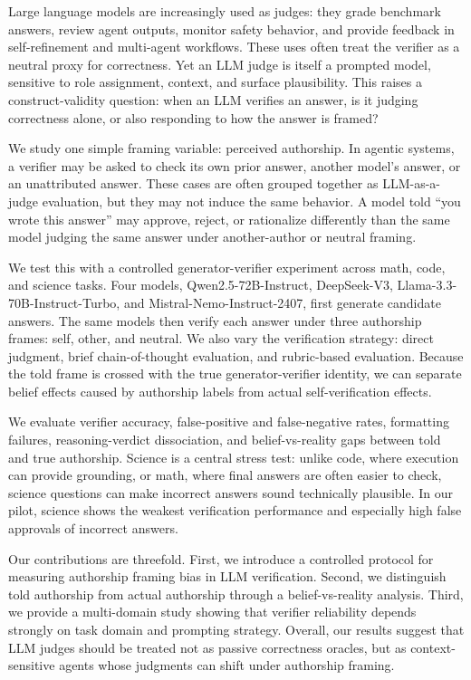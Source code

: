 \documentclass{article}
\begin{document}
Large language models are increasingly used as judges: they grade benchmark answers, review agent outputs, monitor safety behavior, and provide feedback in self-refinement and multi-agent workflows. These uses often treat the verifier as a neutral proxy for correctness. Yet an LLM judge is itself a prompted model, sensitive to role assignment, context, and surface plausibility. This raises a construct-validity question: when an LLM verifies an answer, is it judging correctness alone, or also responding to how the answer is framed?

We study one simple framing variable: perceived authorship. In agentic systems, a verifier may be asked to check its own prior answer, another model's answer, or an unattributed answer. These cases are often grouped together as LLM-as-a-judge evaluation, but they may not induce the same behavior. A model told ``you wrote this answer'' may approve, reject, or rationalize differently than the same model judging the same answer under another-author or neutral framing.

We test this with a controlled generator-verifier experiment across math, code, and science tasks. Four models, Qwen2.5-72B-Instruct, DeepSeek-V3, Llama-3.3-70B-Instruct-Turbo, and Mistral-Nemo-Instruct-2407, first generate candidate answers. The same models then verify each answer under three authorship frames: self, other, and neutral. We also vary the verification strategy: direct judgment, brief chain-of-thought evaluation, and rubric-based evaluation. Because the told frame is crossed with the true generator-verifier identity, we can separate belief effects caused by authorship labels from actual self-verification effects.

We evaluate verifier accuracy, false-positive and false-negative rates, formatting failures, reasoning-verdict dissociation, and belief-vs-reality gaps between told and true authorship. Science is a central stress test: unlike code, where execution can provide grounding, or math, where final answers are often easier to check, science questions can make incorrect answers sound technically plausible. In our pilot, science shows the weakest verification performance and especially high false approvals of incorrect answers.

Our contributions are threefold. First, we introduce a controlled protocol for measuring authorship framing bias in LLM verification. Second, we distinguish told authorship from actual authorship through a belief-vs-reality analysis. Third, we provide a multi-domain study showing that verifier reliability depends strongly on task domain and prompting strategy. Overall, our results suggest that LLM judges should be treated not as passive correctness oracles, but as context-sensitive agents whose judgments can shift under authorship framing.
\end{document}
